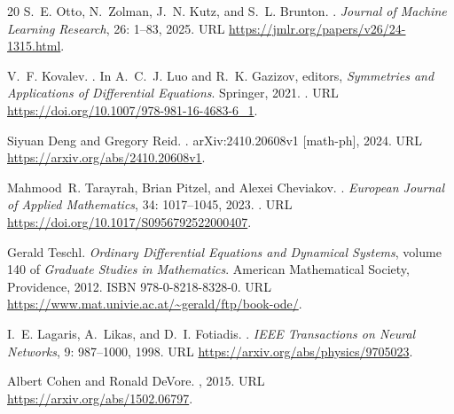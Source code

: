 \documentclass[11pt]{article}
\theoremstyle{definition}
\begin{document}
\begin{thebibliography}{20}
S.~E. Otto, N.~Zolman, J.~N. Kutz, and S.~L. Brunton.
.
\newblock \emph{Journal of Machine Learning Research}, 26: 1--83,
  2025.
\newblock URL \url{https://jmlr.org/papers/v26/24-1315.html}.

V.~F. Kovalev.
.
\newblock In A.~C.~J. Luo and R.~K. Gazizov, editors, \emph{Symmetries and
  Applications of Differential Equations}. Springer, 2021.
\newblock {}.
\newblock URL \url{https://doi.org/10.1007/978-981-16-4683-6_1}.

Siyuan Deng and Gregory Reid.
.
\newblock arXiv:2410.20608v1 [math-ph], 2024.
\newblock URL \url{https://arxiv.org/abs/2410.20608v1}.

Mahmood~R. Tarayrah, Brian Pitzel, and Alexei Cheviakov.
.
\newblock \emph{European Journal of Applied Mathematics}, 34:
  1017--1045, 2023.
\newblock {}.
\newblock URL \url{https://doi.org/10.1017/S0956792522000407}.

Gerald Teschl.
\newblock \emph{Ordinary Differential Equations and Dynamical Systems}, volume
  140 of \emph{Graduate Studies in Mathematics}.
\newblock American Mathematical Society, Providence, 2012.
\newblock ISBN 978-0-8218-8328-0.
\newblock URL \url{https://www.mat.univie.ac.at/~gerald/ftp/book-ode/}.

I.~E. Lagaris, A.~Likas, and D.~I. Fotiadis.
.
\newblock \emph{IEEE Transactions on Neural Networks}, 9: 987--1000,
  1998.
\newblock URL \url{https://arxiv.org/abs/physics/9705023}.

Albert Cohen and Ronald DeVore.
, 2015.
\newblock URL \url{https://arxiv.org/abs/1502.06797}.


\end{thebibliography}
\end{document}
